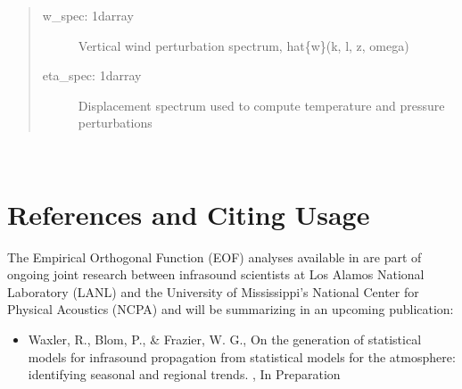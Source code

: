 \documentclass[letterpaper,10pt,english]{sphinxmanual}
\begin{document}
\begin{fulllineitems}
\begin{quote}
\begin{description}
\begin{description}
\begin{description}
\item[{w\_spec: 1darray}] \leavevmode
\sphinxAtStartPar
Vertical wind perturbation spectrum, hat\{w\}(k, l, z, omega)

\item[{eta\_spec: 1darray}] \leavevmode
\sphinxAtStartPar
Displacement spectrum used to compute temperature and pressure perturbations

\end{description}

\end{description}

\end{description}\end{quote}

\end{fulllineitems}


\begin{fulllineitems}
\label{\detokenize{stochprop.gravity:stochprop.gravity_waves.single_fourier_component_wrapper}}~
\end{fulllineitems}



\section{References and Citing Usage}
\label{\detokenize{references:references-and-citing-usage}}\label{\detokenize{references:references}}\label{\detokenize{references::doc}}
\sphinxAtStartPar
The Empirical Orthogonal Function (EOF) analyses available in  are part of ongoing joint research between infrasound scientists at Los Alamos National Laboratory (LANL) and the University of Mississippi’s National Center for Physical Acoustics (NCPA) and will be summarizing in an upcoming publication:
\begin{itemize}
\item {} 
\sphinxAtStartPar
Waxler, R., Blom, P., \& Frazier, W. G., On the generation of statistical models for infrasound propagation from statistical models for the atmosphere: identifying seasonal and regional trends.  , In Preparation

\end{itemize}
\end{document}
